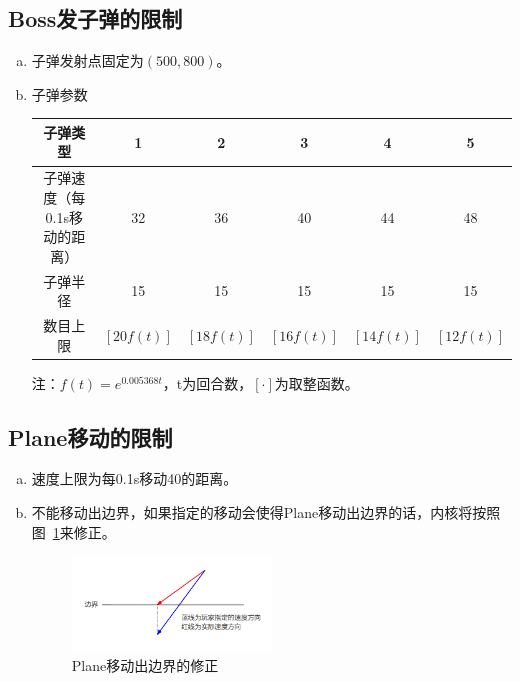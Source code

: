 \documentclass[11pt,a4paper]{article}
\begin{document}
\subsection{Boss发子弹的限制}
\begin{enumerate}[(a)]
\item 子弹发射点固定为$(500,800)$。
\item 子弹参数
\begin{center}
\begin{tabular}{|c|c|c|c|c|c|}
\hline
子弹类型&1&2&3&4&5\\
\hline
子弹速度（每0.1s移动的距离）&32&36&40&44&48\\
\hline
子弹半径&15&15&15&15&15\\
\hline
数目上限&$[20f(t)]$&$[18f(t)]$&$[16f(t)]$&$[14f(t)]$&$[12f(t)]$\\
\hline
\end{tabular}
\end{center}

注：$f(t)=e^{0.005368t}$，t为回合数，$[\cdot]$为取整函数。
\end{enumerate}
\subsection{Plane移动的限制}
\begin{enumerate}[(a)]
\item 速度上限为每0.1s移动40的距离。
\item 不能移动出边界，如果指定的移动会使得Plane移动出边界的话，内核将按照图~\ref{fig:side}来修正。
\begin{figure}[h!]
\centering
\includegraphics[width=0.5\textwidth]{side.png}
\caption{Plane移动出边界的修正}
\label{fig:side}
\end{figure}
\end{enumerate}
\end{document}
